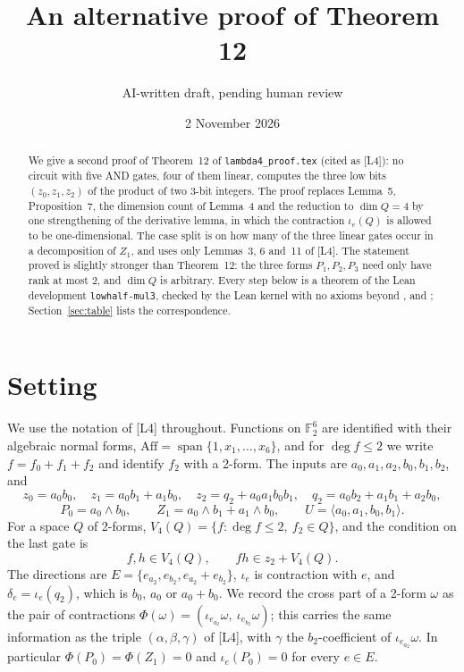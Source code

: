 \documentclass[11pt,a4paper]{article}
\title{\bfseries An alternative proof of Theorem 12}
\author{AI-written draft, pending human review}
\date{2 November 2026}
\theoremstyle{plain}
\theoremstyle{definition}
\theoremstyle{remark}
\newcommand{\F}{\mathbb{F}_2}
\newcommand{\Aff}{\mathrm{Aff}}
\newcommand{\Span}{\operatorname{span}}
\newcommand{\Dir}{E}
\newcommand{\lean}[1]{\texttt{\detokenize{#1}}}
\begin{document}
\maketitle

\begin{abstract}
\noindent
We give a second proof of Theorem~12 of \texttt{lambda4\_proof.tex} (cited as [L4]): no circuit with five AND gates, four of them linear, computes the three low bits $(z_0,z_1,z_2)$ of the product of two 3-bit integers. The proof replaces Lemma~5, Proposition~7, the dimension count of Lemma~4 and the reduction to $\dim Q=4$ by one strengthening of the derivative lemma, in which the contraction $\iota_e(Q)$ is allowed to be one-dimensional. The case split is on how many of the three linear gates occur in a decomposition of $Z_1$, and uses only Lemmas~3, 6 and~11 of [L4]. The statement proved is slightly stronger than Theorem~12: the three forms $P_1,P_2,P_3$ need only have rank at most $2$, and $\dim Q$ is arbitrary. Every step below is a theorem of the Lean development \texttt{lowhalf-mul3}, checked by the Lean kernel with no axioms beyond \lean{propext}, \lean{Classical.choice} and \lean{Quot.sound}; Section~\ref{sec:table} lists the correspondence.
\end{abstract}

\section{Setting}

We use the notation of [L4] throughout. Functions on $\F^6$ are identified with their algebraic normal forms, $\Aff=\Span\{1,x_1,\dots,x_6\}$, and for $\deg f\le2$ we write $f=f_0+f_1+f_2$ and identify $f_2$ with a 2-form. The inputs are $a_0,a_1,a_2,b_0,b_1,b_2$, and
\[
  z_0=a_0b_0,\quad z_1=a_0b_1+a_1b_0,\quad z_2=q_2+a_0a_1b_0b_1,\quad q_2=a_0b_2+a_1b_1+a_2b_0,
\]
\[
  P_0=a_0\wedge b_0,\qquad Z_1=a_0\wedge b_1+a_1\wedge b_0,\qquad U=\langle a_0,a_1,b_0,b_1\rangle .
\]
For a space $Q$ of 2-forms, $V_4(Q)=\{f:\deg f\le2,\ f_2\in Q\}$, and the condition on the last gate is
\begin{equation}\label{eq:star}
  f,h\in V_4(Q),\qquad fh\in z_2+V_4(Q).
\end{equation}
The directions are $\Dir=\{e_{a_2},e_{b_2},e_{a_2}+e_{b_2}\}$, $\iota_e$ is contraction with $e$, and $\delta_e=\iota_e(q_2)$, which is $b_0$, $a_0$ or $a_0+b_0$. We record the cross part of a 2-form $\omega$ as the pair of contractions $\Phi(\omega)=(\iota_{e_{a_2}}\omega,\ \iota_{e_{b_2}}\omega)$; this carries the same information as the triple $(\alpha,\beta,\gamma)$ of [L4], with $\gamma$ the $b_2$-coefficient of $\iota_{e_{a_2}}\omega$. In particular $\Phi(P_0)=\Phi(Z_1)=0$ and $\iota_e(P_0)=0$ for every $e\in\Dir$.
\end{document}
